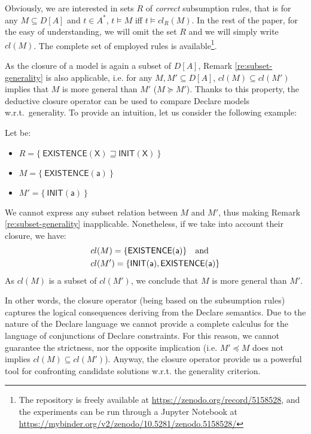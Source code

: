 \noindent Obviously, we are interested in sets $R$ of \emph{correct} subsumption rules, that is for any $M\subseteq D[A]$ and $t\in A^*$, $t\models M$ iff $t\models cl_R(M)$. In the rest of the paper, for the easy of understanding, we will omit the set $R$ and we will simply write $cl(M)$. The complete set of employed rules is available\footnote{The repository is freely available at \url{https://zenodo.org/record/5158528}, and the experiments can be run through a Jupyter Notebook at \url{https://mybinder.org/v2/zenodo/10.5281/zenodo.5158528/}}.


As the closure of a model is again a subset of $D[A]$, Remark \ref{re:subset-generality} is also applicable, i.e. for any $M, M'\subseteq D[A]$, $cl(M)\subseteq cl(M')$ implies that $M$ is more general than $M'$ ($M\succeq M'$).
%
%
Thanks to this property, the deductive closure operator can be used to compare Declare models w.r.t.~generality. To provide an intuition, let us consider the following example:

\begin{example}
Let be:
\begin{itemize}
\item $R=\{\ \mathsf{EXISTENCE(X)} \sqsupseteq \mathsf{INIT(X)}\ \}$
\item $M = \{\ \mathsf{EXISTENCE(a)}\ \}$
\item $M' = \{\ \mathsf{INIT(a)}\ \}$
\end{itemize}
We cannot express any subset relation between $M$ and $M'$, thus making Remark \ref{re:subset-generality} inapplicable.
Nonetheless, if we take into account their closure, we have:
\begin{align*}
	& cl(M)=\{\mathsf{EXISTENCE(a)}\}\quad \textnormal{and} \\
	& cl(M')=\{\mathsf{INIT(a)}, \mathsf{EXISTENCE(a)}\}
\end{align*}
As $cl(M)$ is a subset of $cl(M')$, we conclude that $M$ is more general than $M'$.
\end{example}
%
\noindent In other words, the closure operator (being based on the subsumption rules) captures the logical consequences deriving from the Declare semantics.
Due to the nature of the Declare language we cannot provide a complete calculus for the language of conjunctions of Declare constraints. For this reason, we cannot guarantee the strictness, nor the opposite implication (i.e. $M'\preceq M$ does not implies $cl(M)\subseteq cl(M')$). Anyway, the closure operator provide us a powerful tool for confronting candidate solutions w.r.t. the generality criterion.


